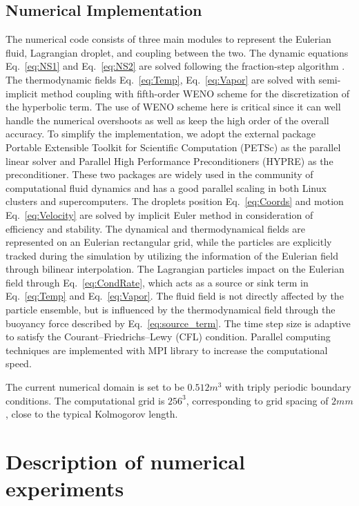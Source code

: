 \documentclass[draft,linenumbers]{AGUJournal}
\newcommand{\Eq}[1]{Eq.~\eqref{#1}} \newcommand{\Fig}[1]{Figure~\ref{#1}}
\begin{document}
\subsection{Numerical Implementation}
The numerical code consists of three main modules to represent the Eulerian fluid, Lagrangian droplet, and coupling between the two. The dynamic equations \Eq{eq:NS1} and \Eq{eq:NS2} are solved following the fraction-step algorithm \citep{Brown2001}. The thermodynamic fields \Eq{eq:Temp}, \Eq{eq:Vapor} are solved with semi-implicit method coupling with fifth-order WENO scheme for the discretization of the hyperbolic term. The use of WENO scheme here is critical since it can well handle the numerical overshoots as well as keep the high order of the overall accuracy. To simplify the implementation, we adopt the external package Portable Extensible Toolkit for Scientific Computation (PETSc) \citep{petsc_cite} as the parallel linear solver and Parallel High Performance Preconditioners (HYPRE) \citep{hypre_cite} as the preconditioner. These two packages are widely used in the community of computational fluid dynamics and has a good parallel scaling in both Linux clusters and supercomputers. The droplets position \Eq{eq:Coords} and motion \Eq{eq:Velocity} are solved by implicit Euler method in consideration of efficiency and stability. The dynamical and thermodynamical fields are represented on an Eulerian rectangular grid, while the particles are explicitly tracked during the simulation by utilizing the information of the Eulerian field through bilinear interpolation. The Lagrangian particles impact on the Eulerian field through \Eq{eq:CondRate}, which acts as a source or sink term in \Eq{eq:Temp} and \Eq{eq:Vapor}. The fluid field is not directly affected by the particle ensemble, but is influenced by the thermodynamical field through the buoyancy force described by \Eq{eq:source_term}. The time step size is adaptive to satisfy the Courant--Friedrichs--Lewy (CFL) condition. Parallel computing techniques are implemented with MPI library to increase the computational speed.

The current numerical domain is set to be $0.512m^{3}$ with triply periodic boundary conditions. The computational grid is $256^{3}$, corresponding to grid spacing of $2mm$, close to the typical Kolmogorov length.

\section{Description of numerical experiments}\label{experiment_description}
\end{document}
